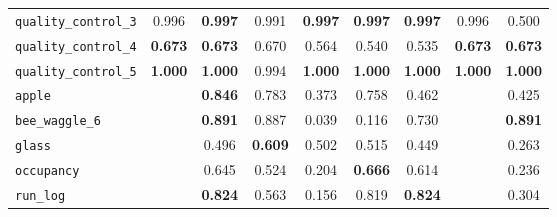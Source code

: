 \begin{tabular}{lcccccccc}
\verb+quality_control_3+ & 0.996 & \textbf{0.997} & 0.991 & \textbf{0.997} & \textbf{0.997} & \textbf{0.997} & 0.996 & 0.500\\
\verb+quality_control_4+ & \textbf{0.673} & \textbf{0.673} & 0.670 & 0.564 & 0.540 & 0.535 & \textbf{0.673} & \textbf{0.673}\\
\verb+quality_control_5+ & \textbf{1.000} & \textbf{1.000} & 0.994 & \textbf{1.000} & \textbf{1.000} & \textbf{1.000} & \textbf{1.000} & \textbf{1.000}\\
\midrule
\verb+apple+ &  & \textbf{0.846} & 0.783 & 0.373 & 0.758 & 0.462 &  & 0.425\\
\verb+bee_waggle_6+ &  & \textbf{0.891} & 0.887 & 0.039 & 0.116 & 0.730 &  & \textbf{0.891}\\
\verb+glass+ &  & 0.496 & \textbf{0.609} & 0.502 & 0.515 & 0.449 &  & 0.263\\
\verb+occupancy+ &  & 0.645 & 0.524 & 0.204 & \textbf{0.666} & 0.614 &  & 0.236\\
\verb+run_log+ &  & \textbf{0.824} & 0.563 & 0.156 & 0.819 & \textbf{0.824} &  & 0.304\\
\bottomrule
\end{tabular}
